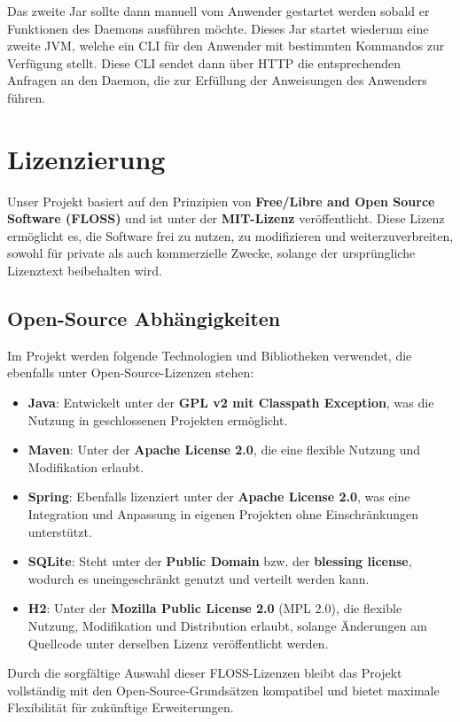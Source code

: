 \documentclass[a4paper,12pt]{report}
\begin{document}
    Das zweite Jar sollte dann manuell vom Anwender gestartet werden sobald er Funktionen des Daemons ausführen möchte.
    Dieses Jar startet wiederum eine zweite JVM, welche ein CLI für den Anwender mit bestimmten Kommandos zur Verfügung stellt.
    Diese CLI sendet dann über HTTP die entsprechenden Anfragen an den Daemon, die zur Erfüllung der Anweisungen des Anwenders führen.


    \section{Lizenzierung}
    Unser Projekt basiert auf den Prinzipien von \textbf{Free/Libre and Open Source Software (FLOSS)} und ist unter der \textbf{MIT-Lizenz} veröffentlicht.
    Diese Lizenz ermöglicht es, die Software frei zu nutzen, zu modifizieren und weiterzuverbreiten, sowohl für private als auch kommerzielle Zwecke, solange der ursprüngliche Lizenztext beibehalten wird.

    \subsection{Open-Source Abhängigkeiten}
    Im Projekt werden folgende Technologien und Bibliotheken verwendet, die ebenfalls unter Open-Source-Lizenzen stehen:

    \begin{itemize}
        \item \textbf{Java}: Entwickelt unter der \textbf{GPL v2 mit Classpath Exception}, was die Nutzung in geschlossenen Projekten ermöglicht.
        \item \textbf{Maven}: Unter der \textbf{Apache License 2.0}, die eine flexible Nutzung und Modifikation erlaubt.
        \item \textbf{Spring}: Ebenfalls lizenziert unter der \textbf{Apache License 2.0}, was eine Integration und Anpassung in eigenen Projekten ohne Einschränkungen unterstützt.
        \item \textbf{SQLite}: Steht unter der \textbf{Public Domain} bzw. der \textbf{blessing license}, wodurch es uneingeschränkt genutzt und verteilt werden kann.
        \item \textbf{H2}: Unter der \textbf{Mozilla Public License 2.0} (MPL 2.0), die flexible Nutzung, Modifikation und Distribution erlaubt, solange Änderungen am Quellcode unter derselben Lizenz veröffentlicht werden.
    \end{itemize}

    Durch die sorgfältige Auswahl dieser FLOSS-Lizenzen bleibt das Projekt vollständig mit den Open-Source-Grundsätzen kompatibel und bietet maximale Flexibilität für zukünftige Erweiterungen.
\end{document}
